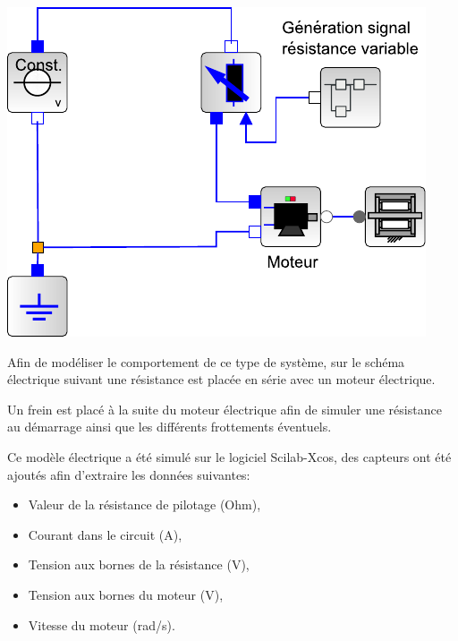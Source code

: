 \begin{minipage}{0.4\linewidth}
 \centering\includegraphics[width=0.9\linewidth]{img/Rheostat_xcos}
\end{minipage}
 \hfill
\begin{minipage}{0.55\linewidth}
Afin de modéliser le comportement de ce type de système, sur le schéma électrique suivant une résistance est placée en série avec un moteur électrique.

Un frein est placé à la suite du moteur électrique afin de simuler une résistance au démarrage ainsi que les différents frottements éventuels.
\end{minipage}

\vspace{1cm}

Ce modèle électrique a été simulé sur le logiciel Scilab-Xcos, des capteurs ont été ajoutés afin d'extraire les données suivantes:
\begin{itemize}
 \item Valeur de la résistance de pilotage (Ohm),
 \item Courant dans le circuit (A),
 \item Tension aux bornes de la résistance (V),
 \item Tension aux bornes du moteur (V),
 \item Vitesse du moteur (rad/s).
\end{itemize}

